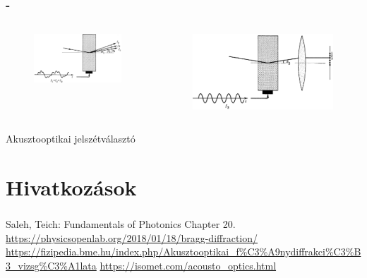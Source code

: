 \documentclass[aspectratio=169]{beamer}
\newcommand{\framet}{\frametitle{\secname{} - \subsecname}}
\begin{document}
\begin{frame}
\framet
\begin{columns}
\begin{figure}
\includegraphics[width=\textwidth]{ic1.png}
\end{figure}
\begin{figure}
\includegraphics[width=\textwidth]{ic2.png}
\end{figure}
\end{columns}
\centering
Akusztooptikai jelszétválasztó
\end{frame}

\section{Hivatkozások}
\begin{frame}
\frametitle{\secname}
\begin{thebibliography}{99}
\footnotesize
{} Saleh, Teich: Fundamentals of Photonics Chapter 20.
 \url{https://physicsopenlab.org/2018/01/18/bragg-diffraction/}
 \url{https://fizipedia.bme.hu/index.php/Akusztooptikai_f\%C3\%A9nydiffrakci\%C3\%B3_vizsg\%C3\%A1lata}
 \url{https://isomet.com/acousto_optics.html}
\end{thebibliography}
\end{frame}
\end{document}
